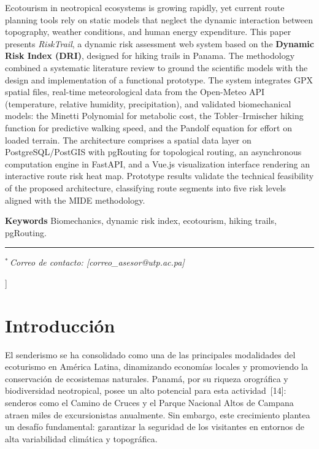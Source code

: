 \documentclass[10pt,letterpaper,twocolumn]{article}
\begin{document}
  \enspace
  Ecotourism in neotropical ecosystems is growing rapidly, yet current
  route planning tools rely on static models that neglect the dynamic
  interaction between topography, weather conditions, and human energy
  expenditure. This paper presents \emph{RiskTrail}, a dynamic risk
  assessment web system based on the \textbf{Dynamic Risk Index (DRI)},
  designed for hiking trails in Panama. The methodology combined a
  systematic literature review to ground the scientific models with the
  design and implementation of a functional prototype. The system
  integrates GPX spatial files, real-time meteorological data from the
  Open-Meteo API (temperature, relative humidity, precipitation), and
  validated biomechanical models: the Minetti Polynomial for metabolic
  cost, the Tobler--Irmischer hiking function for predictive walking
  speed, and the Pandolf equation for effort on loaded terrain. The
  architecture comprises a spatial data layer on PostgreSQL/PostGIS with
  pgRouting for topological routing, an asynchronous computation engine
  in FastAPI, and a Vue.js visualization interface rendering an
  interactive route risk heat map. Prototype results validate the
  technical feasibility of the proposed architecture, classifying route
  segments into five risk levels aligned with the MIDE methodology.\par
  \vspace{4pt}
  \noindent\textbf{Keywords}\enspace
  Biomechanics, dynamic risk index, ecotourism, hiking trails,
  pgRouting.\par
  \vspace{10pt}
  \noindent\rule{\textwidth}{0.4pt}
  \vspace{4pt}
  {\fontsize{8}{10}\selectfont\itshape
  $^{*}$\,Correo de contacto: [correo\_asesor@utp.ac.pa]\par}
  \vspace{12pt}
]


\section{Introducci\'{o}n}

El senderismo se ha consolidado como una de las principales modalidades
del ecoturismo en Am\'{e}rica Latina, dinamizando econom\'{i}as locales y
promoviendo la conservaci\'{o}n de ecosistemas naturales. Panam\'{a}, por
su riqueza orogr\'{a}fica y biodiversidad neotropical, posee un alto
potencial para esta actividad~[14]: senderos como el Camino de Cruces y el
Parque Nacional Altos de Campana atraen miles de excursionistas anualmente.
Sin embargo, este crecimiento plantea un desaf\'{i}o fundamental: garantizar
la seguridad de los visitantes en entornos de alta variabilidad
clim\'{a}tica y topogr\'{a}fica.
\end{document}
